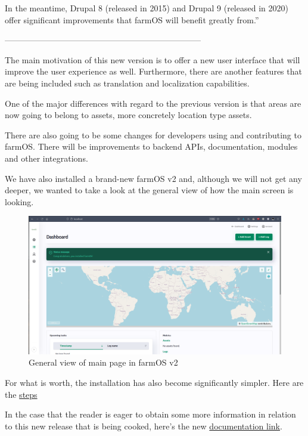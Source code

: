 In the meantime, Drupal 8 (released in 2015) and Drupal 9 (released in 2020) offer significant improvements that farmOS will benefit greatly from.''

-----------------------------------------------------------------------
\vspace{3mm}

The main motivation\cite{farmosv2} of this new version is to offer a new user interface that will improve the user experience as well. Furthermore, there are another features that are being included such as translation and localization capabilities.

One of the major differences with regard to the previous version is that areas are now going to belong to assets, more concretely location type assets.

There are also going to be some changes for developers using and contributing to farmOS. There will be improvements to backend APIs, documentation, modules and other integrations.

We have also installed a brand-new farmOS v2 and, although we will not get any deeper, we wanted to take a look at the general view of how the main screen is looking.

\vspace{3mm}

\begin{figure}[H]
    \centering
    \includegraphics[width=1.07\textwidth]{fig/brandnew-farmosv2.png}
    \caption{General view of main page in farmOS v2}
    \label{fig:brandnew-farmosv2}
\end{figure}

\vspace{3mm}

For what is worth, the installation has also become significantly simpler. Here are the \href{https://docs.farmos.org/development/environment/}{steps}

In the case that the reader is eager to obtain some more information in relation to this new release that is being cooked, here's the new \href{https://docs.farmos.org/model/}{documentation link}.

